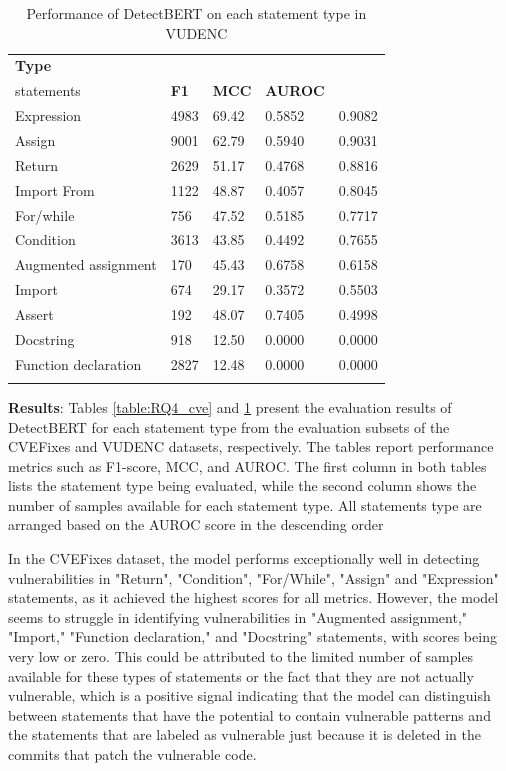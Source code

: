 \documentclass{ieeeaccess}
\begin{document}
\begin{table}[h]
\centering

\begin{tabular}{lllll}
\Xhline{2\arrayrulewidth}
\textbf{Type} & \textbf{\makecell{Number of\\ statements}} &\textbf{F1} & \textbf{MCC} & \textbf{AUROC}\\
\hline
Expression           & 4983 & 69.42 & 0.5852 & 0.9082\\
\rowcolor{gray!15} 
Assign               & 9001 & 62.79 & 0.5940 & 0.9031\\
Return               & 2629 & 51.17 & 0.4768 & 0.8816\\
\rowcolor{gray!15} 
Import  From          & 1122 & 48.87 & 0.4057 & 0.8045\\
For/while            & 756  & 47.52 & 0.5185 & 0.7717\\
\rowcolor{gray!15} 
Condition            & 3613 & 43.85 & 0.4492 & 0.7655\\
Augmented assignment & 170  & 45.43 & 0.6758 & 0.6158\\
\rowcolor{gray!15} 
Import               & 674  & 29.17 & 0.3572 & 0.5503\\
Assert               & 192  & 48.07 & 0.7405 & 0.4998\\
\rowcolor{gray!15} 
Docstring            & 918  & 12.50 & 0.0000 & 0.0000\\
Function declaration & 2827 & 12.48 & 0.0000 & 0.0000\\
\Xhline{2\arrayrulewidth}
\end{tabular}
\caption{Performance of DetectBERT on each statement type in VUDENC}
\label{table:RQ4_VUDENC}
\end{table}


\par \textbf{Results}: Tables \ref{table:RQ4_cve} and \ref{table:RQ4_VUDENC} present the evaluation results of DetectBERT for each statement type from the evaluation subsets of the CVEFixes and VUDENC datasets, respectively. The tables report performance metrics such as F1-score, MCC, and AUROC. The first column in both tables lists the statement type being evaluated, while the second column shows the number of samples available for each statement type. All statements type are arranged based on the AUROC score in the descending order

\par In the CVEFixes dataset, the model performs exceptionally well in detecting vulnerabilities in "Return", "Condition", "For/While", "Assign" and "Expression" statements, as it achieved the highest scores for all metrics. However, the model seems to struggle in identifying vulnerabilities in "Augmented assignment," "Import," "Function declaration," and "Docstring" statements, with scores being very low or zero. This could be attributed to the limited number of samples available for these types of statements or the fact that they are not actually vulnerable, which is a positive signal indicating that the model can distinguish between statements that have the potential to contain vulnerable patterns and the statements that are labeled as vulnerable just because it is deleted in the commits that patch the vulnerable code.
\end{document}
